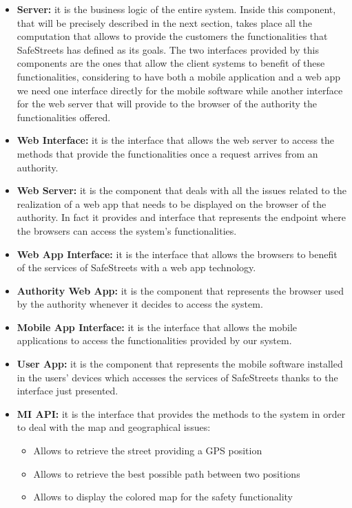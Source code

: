 		\begin{itemize}
			\item \textbf{Server:} it is the business logic of the entire system. Inside this component, that will be precisely described in the next section, takes place all the computation that allows to provide the customers the functionalities that SafeStreets has defined as its goals. The two interfaces provided by this components are the ones that allow the client systems to benefit of these functionalities, considering to have both a mobile application and a web app we need one interface directly for the mobile software while another interface for the web server that will provide to the browser of the authority the functionalities offered.
			
			\item \textbf{Web Interface:} it is the interface that allows the web server to access the methods that provide the functionalities once a request arrives from an authority.
			
			\item \textbf{Web Server:} it is the component that deals with all the issues related to the realization of a web app that needs to be displayed on the browser of the authority. In fact it provides and interface that  represents the endpoint where the browsers can access the system's functionalities.
			
			\item \textbf{Web App Interface:} it is the interface that allows the browsers to benefit of the services of SafeStreets with a web app technology.
			
			\item \textbf{Authority Web App:} it is the component that represents the browser used by the authority whenever it decides to access the system.
			
			\item \textbf{Mobile App Interface:} it is the interface that allows the mobile applications to access the functionalities provided by our system.
			
			\item \textbf{User App:} it is the component that represents the mobile software installed in the users' devices which accesses the services of SafeStreets thanks to the interface just presented.
			
			\item \textbf{MI API:} it is the interface that provides the methods to the system in order to deal with the map and geographical issues:
				\begin{itemize}
					\item Allows to retrieve the street providing a GPS position
					\item Allows to retrieve the best possible path between two positions
					\item Allows to display the colored map for the safety functionality
				\end{itemize}
			

\end{itemize}
